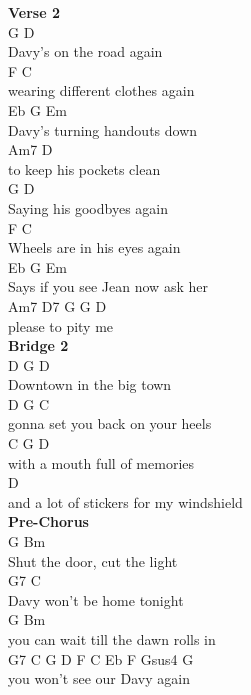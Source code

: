 \documentclass[a4paper]{article}
\begin{document}
{{        }
        \textbf{Verse 2}
        ~\\
        {
            \cutive
            \obeyspaces
G             D
\\
Davy's on the road again
\\
F                 C
\\
wearing different clothes again
\\
Eb             G        Em
\\
Davy's turning handouts down
\\
Am7                 D
\\
to keep his pockets clean
\\
G              D
\\
Saying his goodbyes again
\\
F                 C
\\
Wheels are in his eyes again
\\
Eb              G        Em
\\
Says if you see Jean now ask her
\\
Am7       D7   G   G  D
\\
please to pity me
\\

        }
        \textbf{Bridge 2}
        ~\\
        {
            \cutive
            \obeyspaces
D                        G  D
\\
Downtown in the big town
\\
D                                G  C
\\
gonna set you back on your heels
\\
C                             G  D
\\
with a mouth full of memories
\\
D
\\
and a lot of stickers for my windshield
\\

        }
        \textbf{Pre-Chorus}
        ~\\
        {
            \cutive
            \obeyspaces
G              Bm
\\
Shut the door, cut the light
\\
G7            C
\\
Davy won't be home tonight
\\
G                     Bm
\\
you can wait till the dawn rolls in
\\
G7                C     G     D  F  C  Eb  F  Gsus4  G
\\
you won't see our Davy again
\\

}}
\end{document}
